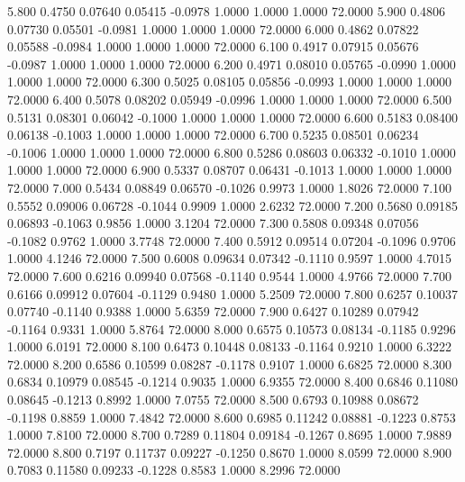    5.800   0.4750   0.07640   0.05415  -0.0978   1.0000   1.0000   1.0000  72.0000
   5.900   0.4806   0.07730   0.05501  -0.0981   1.0000   1.0000   1.0000  72.0000
   6.000   0.4862   0.07822   0.05588  -0.0984   1.0000   1.0000   1.0000  72.0000
   6.100   0.4917   0.07915   0.05676  -0.0987   1.0000   1.0000   1.0000  72.0000
   6.200   0.4971   0.08010   0.05765  -0.0990   1.0000   1.0000   1.0000  72.0000
   6.300   0.5025   0.08105   0.05856  -0.0993   1.0000   1.0000   1.0000  72.0000
   6.400   0.5078   0.08202   0.05949  -0.0996   1.0000   1.0000   1.0000  72.0000
   6.500   0.5131   0.08301   0.06042  -0.1000   1.0000   1.0000   1.0000  72.0000
   6.600   0.5183   0.08400   0.06138  -0.1003   1.0000   1.0000   1.0000  72.0000
   6.700   0.5235   0.08501   0.06234  -0.1006   1.0000   1.0000   1.0000  72.0000
   6.800   0.5286   0.08603   0.06332  -0.1010   1.0000   1.0000   1.0000  72.0000
   6.900   0.5337   0.08707   0.06431  -0.1013   1.0000   1.0000   1.0000  72.0000
   7.000   0.5434   0.08849   0.06570  -0.1026   0.9973   1.0000   1.8026  72.0000
   7.100   0.5552   0.09006   0.06728  -0.1044   0.9909   1.0000   2.6232  72.0000
   7.200   0.5680   0.09185   0.06893  -0.1063   0.9856   1.0000   3.1204  72.0000
   7.300   0.5808   0.09348   0.07056  -0.1082   0.9762   1.0000   3.7748  72.0000
   7.400   0.5912   0.09514   0.07204  -0.1096   0.9706   1.0000   4.1246  72.0000
   7.500   0.6008   0.09634   0.07342  -0.1110   0.9597   1.0000   4.7015  72.0000
   7.600   0.6216   0.09940   0.07568  -0.1140   0.9544   1.0000   4.9766  72.0000
   7.700   0.6166   0.09912   0.07604  -0.1129   0.9480   1.0000   5.2509  72.0000
   7.800   0.6257   0.10037   0.07740  -0.1140   0.9388   1.0000   5.6359  72.0000
   7.900   0.6427   0.10289   0.07942  -0.1164   0.9331   1.0000   5.8764  72.0000
   8.000   0.6575   0.10573   0.08134  -0.1185   0.9296   1.0000   6.0191  72.0000
   8.100   0.6473   0.10448   0.08133  -0.1164   0.9210   1.0000   6.3222  72.0000
   8.200   0.6586   0.10599   0.08287  -0.1178   0.9107   1.0000   6.6825  72.0000
   8.300   0.6834   0.10979   0.08545  -0.1214   0.9035   1.0000   6.9355  72.0000
   8.400   0.6846   0.11080   0.08645  -0.1213   0.8992   1.0000   7.0755  72.0000
   8.500   0.6793   0.10988   0.08672  -0.1198   0.8859   1.0000   7.4842  72.0000
   8.600   0.6985   0.11242   0.08881  -0.1223   0.8753   1.0000   7.8100  72.0000
   8.700   0.7289   0.11804   0.09184  -0.1267   0.8695   1.0000   7.9889  72.0000
   8.800   0.7197   0.11737   0.09227  -0.1250   0.8670   1.0000   8.0599  72.0000
   8.900   0.7083   0.11580   0.09233  -0.1228   0.8583   1.0000   8.2996  72.0000
